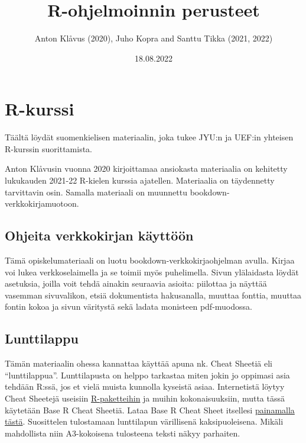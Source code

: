 \documentclass[
]{book}
\title{R-ohjelmoinnin perusteet}
\author{Anton Klåvus (2020), Juho Kopra and Santtu Tikka (2021, 2022)}
\date{18.08.2022}
\begin{document}
\maketitle

{
\setcounter{tocdepth}{1}
\tableofcontents
}
\hypertarget{r-kurssi}{%
\chapter*{R-kurssi}\label{r-kurssi}}

Täältä löydät suomenkielisen materiaalin, joka tukee JYU:n ja UEF:in yhteisen R-kurssin suorittamista.

Anton Klåvusin vuonna 2020 kirjoittamaa ansiokasta materiaalia on kehitetty lukukauden 2021-22 R-kielen kurssia ajatellen. Materiaalia on täydennetty tarvittavin osin. Samalla materiaali on muunnettu bookdown-verkkokirjamuotoon.

\hypertarget{ohjeita-verkkokirjan-kuxe4yttuxf6uxf6n}{%
\section*{Ohjeita verkkokirjan käyttöön}\label{ohjeita-verkkokirjan-kuxe4yttuxf6uxf6n}}

Tämä opiskelumateriaali on luotu bookdown-verkkokirjaohjelman avulla. Kirjaa voi lukea verkkoselaimella ja se toimii myös puhelimella. Sivun ylälaidasta löydät asetuksia, joilla voit tehdä ainakin seuraavia asioita: piilottaa ja näyttää vasemman sivuvalikon, etsiä dokumentista hakusanalla, muuttaa fonttia, muuttaa fontin kokoa ja sivun väritystä sekä ladata monisteen pdf-muodossa.

\hypertarget{lunttilappu}{%
\section*{Lunttilappu}\label{lunttilappu}}

Tämän materiaalin ohessa kannattaa käyttää apuna nk. Cheat Sheetiä eli ``lunttilappua''. Lunttilapusta on helppo tarkastaa miten jokin jo oppimasi asia tehdään R:ssä, jos et vielä muista kunnolla kyseistä asiaa. Internetistä löytyy Cheat Sheetejä useisiin \href{https://www.rstudio.com/resources/cheatsheets/}{R-paketteihin} ja muihin kokonaisuuksiin, mutta tässä käytetään Base R Cheat Sheetiä. Lataa Base R Cheat Sheet itsellesi \href{files/base_R_cheat_sheet.pdf}{painamalla tästä}. Suosittelen tulostamaan lunttilapun värillisenä kaksipuoleisena. Mikäli mahdollista niin A3-kokoisena tulosteena teksti näkyy parhaiten.
\end{document}
